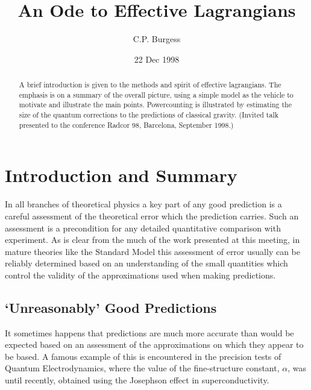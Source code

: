 \documentclass[12pt]{article}
\date{22 Dec 1998}
\begin{document}
\title{An Ode to Effective Lagrangians}
%
\author{C.P. Burgess}
%


\maketitle


\begin{abstract}
A brief introduction is given to
the methods and spirit of effective lagrangians. The emphasis
is on a summary of the overall picture, using a simple model
as the vehicle to motivate and illustrate the main points. 
Powercounting is illustrated by estimating the size of 
the quantum corrections to the predictions of classical gravity.  
(Invited talk presented to the conference Radcor 98, Barcelona, 
September 1998.)
\end{abstract}

\section{Introduction and Summary}

In all branches of theoretical physics a key part of any good
prediction is a careful assessment of the theoretical error which
the prediction carries. Such an assessment is a precondition for any
detailed quantitative comparison with experiment. As is 
clear from the much of the work presented at this meeting, in mature
theories like the Standard Model this assessment of error usually can
be reliably determined based on an understanding of
the small quantities which control the validity of the approximations
used when making predictions. 

\subsection{`Unreasonably' Good Predictions}

It sometimes happens that predictions are much more accurate
than would be expected based on an assessment of 
the approximations on which they appear to be based. A
famous example of this is encountered in the precision tests of
Quantum Electrodynamics, where the value of the
fine-structure constant, $\alpha$, was until recently, 
obtained using the Josephson effect in superconductivity.
\end{document}
